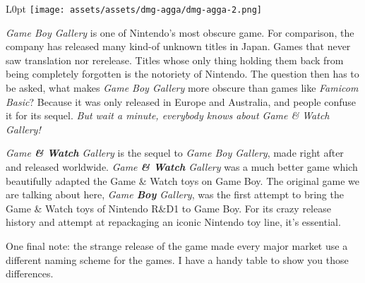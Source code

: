 \documentclass{book}
\let\oldcenter\center
\let\oldendcenter\endcenter
\renewenvironment{center}{\setlength\topsep{0pt}\oldcenter}{\oldendcenter}
\begin{document}
\begin{wrapfigure}{L}{0pt} \texttt{[image: assets/assets/dmg-agga/dmg-agga-2.png]}\end{wrapfigure}
\emph{Game Boy Gallery} is one of Nintendo’s most obscure game. For comparison, the company has released many kind-of unknown titles in Japan. Games that never saw translation nor rerelease. Titles whose only thing holding them back from being completely forgotten is the notoriety of Nintendo. The question then has to be asked, what makes \emph{Game Boy Gallery} more obscure than games like \emph{Famicom Basic}? Because it was only released in Europe and Australia, and people confuse it for its sequel. \emph{But wait a minute, everybody knows about Game \& Watch Gallery!}

\begin{center}
\vspace{8pt}
\quad\vspace{4pt}
\end{center}

\emph{Game \textbf{\& Watch} Gallery} is the sequel to \emph{Game Boy Gallery}, made right after and released worldwide. \emph{Game \textbf{\& Watch} Gallery} was a much better game which beautifully adapted the Game \& Watch toys on Game Boy. The original game we are talking about here, \emph{Game \textbf{Boy} Gallery}, was the first attempt to bring the Game \& Watch toys of Nintendo R\&D1 to Game Boy. For its crazy release history and attempt at repackaging an iconic Nintendo toy line, it’s essential.

One final note: the strange release of the game made every major market use a different naming scheme for the games. I have a handy table to show you those differences.
\end{document}
